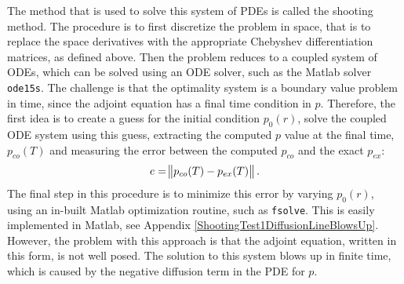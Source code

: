 The method that is used to solve this system of PDEs is called the shooting method.
The procedure is to first discretize the problem in space, that is to replace the space derivatives with the appropriate Chebyshev differentiation matrices, as defined above. Then the problem reduces to a coupled system of ODEs, which can be solved using an ODE solver, such as the Matlab solver \texttt{ode15s}. The challenge is that the optimality system is a boundary value problem in time, since the adjoint equation has a final time condition in $p$. 
Therefore, the first idea is to create a guess for the initial condition $p_0(r)$, solve the coupled ODE system using this guess, extracting the computed $p$ value at the final time, $p_{co}(T)$ and measuring the error between the computed $p_{co}$ and the exact $p_{ex}$:
\begin{align*}
e= \norm{p_{co}(T) - p_{ex}(T)}.
\end{align*}
The final step in this procedure is to minimize this error by varying $p_0(r)$, using an in-built Matlab optimization routine, such as \texttt{fsolve}.
This is easily implemented in Matlab, see Appendix \ref{ShootingTest1DiffusionLineBlowsUp}.
However, the problem with this approach is that the adjoint equation, written in this form, is not well posed. The solution to this system blows up in finite time, which is caused by the negative diffusion term in the PDE for $p$.\\

